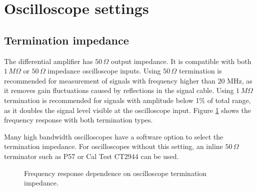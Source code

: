 \documentclass[10pt]{manual}
\begin{document}
\section{Oscilloscope settings}
\subsection{Termination impedance}
The differential amplifier has $50\,\Omega$ output impedance.
It is compatible with both $1\,M\Omega$ or $50\,\Omega$ impedance oscilloscope inputs.
Using $50\,\Omega$ termination is recommended for measurement of signals with frequency higher than 20 MHz,
as it removes gain fluctuations caused by reflections in the signal cable.
Using $1\,M\Omega$ termination is recommended for signals with amplitude below 1\% of total range,
as it doubles the signal level visible at the oscilloscope input.
Figure \ref{fig_termination} shows the frequency response with both termination types.

Many high bandwidth oscilloscopes have a software option to select the termination impedance.
For oscilloscopes without this setting, an inline $50\,\Omega$ terminator such as P57 or Cal Test CT2944 can be used.

\begin{figure}[h]
    \sffamily
    \caption{Frequency response dependence on oscilloscope termination impedance.}
    \label{fig_termination}
\end{figure}
\end{document}
